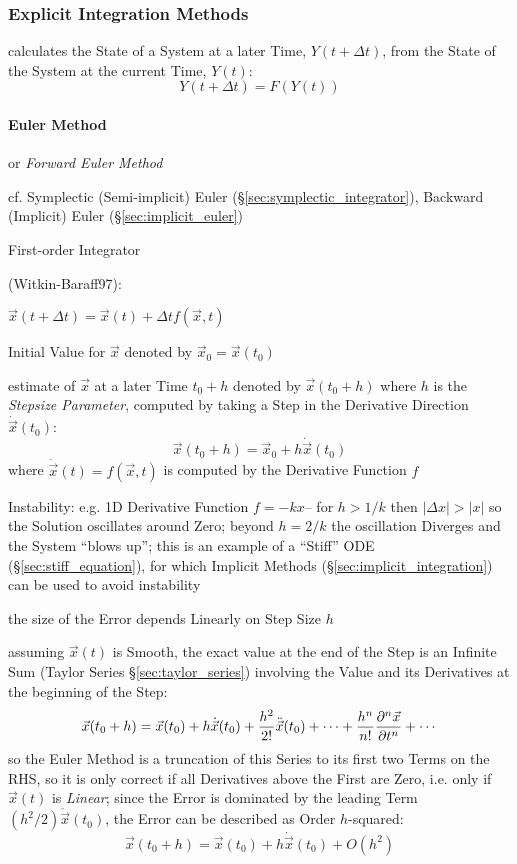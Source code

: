 \subsubsection{Explicit Integration Methods}\label{sec:explicit_integration}

calculates the State of a System at a later Time, $Y(t + \Delta{t})$, from the
State of the System at the current Time, $Y(t)$:
\[
  Y(t + \Delta{t}) = F(Y(t))
\]



\paragraph{Euler Method}\label{sec:euler_method}\hfill

or \emph{Forward Euler Method}

\fist cf. Symplectic (Semi-implicit) Euler (\S\ref{sec:symplectic_integrator}),
Backward (Implicit) Euler (\S\ref{sec:implicit_euler})

First-order Integrator

(Witkin-Baraff97):

$\vec{x}(t + \Delta{t}) = \vec{x}(t) + \Delta{t}f(\vec{x},t)$

Initial Value for $\vec{x}$ denoted by $\vec{x}_0 = \vec{x}(t_0)$

estimate of $\vec{x}$ at a later Time $t_0 + h$ denoted by $\vec{x}(t_0 + h)$
where $h$ is the \emph{Stepsize Parameter}, computed by taking a Step in the
Derivative Direction $\dot{\vec{x}}(t_0)$:
\[
  \vec{x}(t_0 + h) = \vec{x}_0 + h\dot{\vec{x}}(t_0)
\]
where $\dot{\vec{x}}(t) = f(\vec{x}, t)$ is computed by the Derivative Function
$f$

Instability: e.g. 1D Derivative Function $f = -kx$-- for $h > 1/k$ then
$|\Delta{x}| > |x|$ so the Solution oscillates around Zero; beyond $h = 2/k$ the
oscillation Diverges and the System ``blows up''; this is an example of a
``Stiff'' ODE (\S\ref{sec:stiff_equation}), for which Implicit Methods
(\S\ref{sec:implicit_integration}) can be used to avoid instability

the size of the Error depends Linearly on Step Size $h$

assuming $\vec{x}(t)$ is Smooth, the exact value at the end of the Step is an
Infinite Sum (Taylor Series \S\ref{sec:taylor_series}) involving the Value and
its Derivatives at the beginning of the Step:
\[
  \vec{x}(t_0 + h) = \vec{x}(t_0) + h\dot{\vec{x}}(t_0) +
    \frac{h^2}{2!}\ddot{\vec{x}}(t_0) + \cdots +
    \frac{h^n}{n!}\frac{\partial{^n\vec{x}}}{\partial{t^n}} + \cdots
\]
so the Euler Method is a truncation of this Series to its first two Terms on the
RHS, so it is only correct if all Derivatives above the First are Zero, i.e.
only if $\vec{x}(t)$ is \emph{Linear}; since the Error is dominated by the
leading Term $(h^2/2)\ddot{\vec{x}}(t_0)$, the Error can be described as Order
$h$-squared:
\[
  \vec{x}(t_0 + h) = \vec{x}(t_0) + h\dot{\vec{x}}(t_0) + O(h^2)
\]

